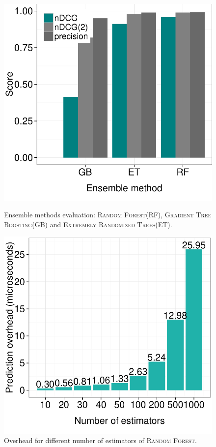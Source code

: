 \begin{figure}[htbp]
	\begin{minipage}[t]{0.48\linewidth}
     \includegraphics[width=.9\textwidth]{inputs/img/ensemble_method_eval}
		\caption{Ensemble methods evaluation: \textsc{Random Forest}(RF), \textsc{Gradient Tree Boosting}(GB) and \textsc{Extremely Randomized Trees}(ET).}
		\label{fig:ensemble_method_eval}
	\end{minipage}
	\hspace{0.1cm}
	\begin{minipage}[t]{0.48\linewidth}
		\includegraphics[width=.9\textwidth]{inputs/img/rf_learners}
		\caption{Overhead for different number of estimators of \textsc{Random Forest}.}
		\label{fig:rf_learners}
	\end{minipage}
\end{figure}

